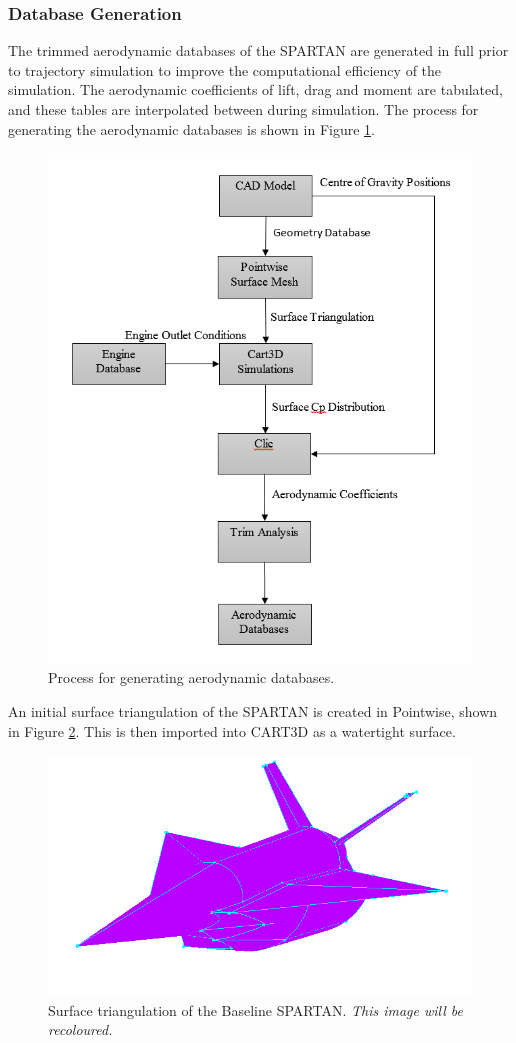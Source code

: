 		\subsubsection{Database Generation}\label{sec:database}
		The trimmed aerodynamic databases of the SPARTAN are generated in full prior to trajectory simulation to improve the computational efficiency of the simulation. The aerodynamic coefficients of lift, drag and moment are tabulated, and these tables are interpolated between during simulation. 
The process for generating the aerodynamic databases is shown in Figure \ref{fig:FlowChart}. 
				\begin{figure}[ht]
					\centering
					\includegraphics[width=0.7\linewidth]{figures/3_vehicle_design/FlowChart}
					\caption{Process for generating aerodynamic databases.}
					\label{fig:FlowChart}
				\end{figure}
		An initial surface triangulation of the SPARTAN is created in Pointwise, shown in Figure \ref{fig:Pointwise}. This is then imported into CART3D as a watertight surface. 
				\begin{figure}[ht]
					\centering
					\includegraphics[width=0.6\linewidth]{figures/3_vehicle_design/Pointwise}
					\caption{Surface triangulation of the Baseline SPARTAN. \textit{This image will be recoloured.}}
					\label{fig:Pointwise}
				\end{figure}


